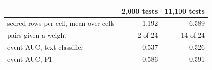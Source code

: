 \begin{tabular}{lrr}
\toprule
 & 2,000 tests & 11,100 tests \\
\midrule
scored rows per cell, mean over cells & 1,192 & 6,589 \\
pairs given a weight & 2 of 24 & 14 of 24 \\
event AUC, text classifier & 0.537 & 0.526 \\
event AUC, P1 & 0.586 & 0.591 \\
\bottomrule
\end{tabular}
